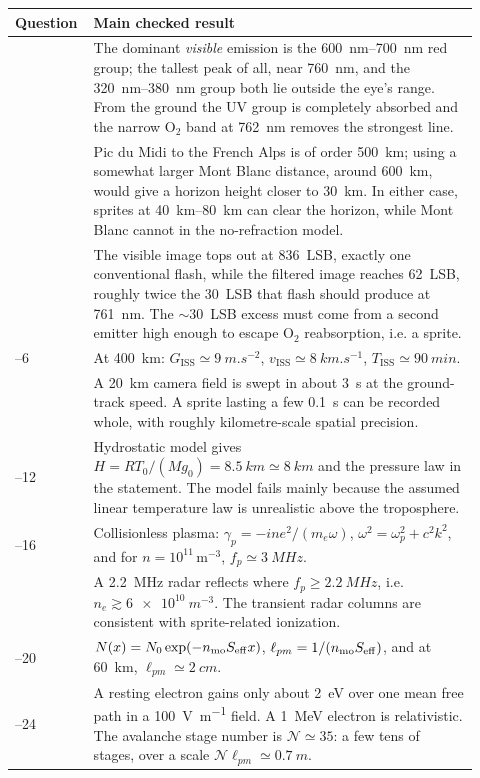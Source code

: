 \documentclass[11pt,a4paper]{article}
\newcommand{\ISS}{\mathrm{ISS}}
\newcommand{\Otwo}{\ensuremath{\mathrm{O}_2}}
\begin{document}
\begin{longtable}{>{\raggedright\arraybackslash}p{0.12\linewidth}>{\raggedright\arraybackslash}p{0.80\linewidth}}
\toprule
\textbf{Question} & \textbf{Main checked result}\\
\midrule
1 & The dominant \emph{visible} emission is the \SIrange{600}{700}{nm} red group; the tallest peak of all, near \SI{760}{nm}, and the \SIrange{320}{380}{nm} group both lie outside the eye's range. From the ground the UV group is completely absorbed and the narrow \Otwo{} band at \SI{762}{nm} removes the strongest line.\\
2 & Pic du Midi to the French Alps is of order \SI{500}{km}; using a somewhat larger Mont Blanc distance, around \SI{600}{km}, would give a horizon height closer to \SI{30}{km}. In either case, sprites at \SIrange{40}{80}{km} can clear the horizon, while Mont Blanc cannot in the no-refraction model.\\
3 & The visible image tops out at 836~LSB, exactly one conventional flash, while the filtered image reaches 62~LSB, roughly twice the 30~LSB that flash should produce at \SI{761}{nm}. The $\sim$30~LSB excess must come from a second emitter high enough to escape \Otwo{} reabsorption, i.e. a sprite.\\
4--6 & At \SI{400}{km}: $G_{\ISS}\simeq \SI{9}{m.s^{-2}}$, $v_{\ISS}\simeq \SI{8}{km.s^{-1}}$, $T_{\ISS}\simeq \SI{90}{min}$.\\
7 & A \SI{20}{km} camera field is swept in about \SI{3}{s} at the ground-track speed. A sprite lasting a few \SI{0.1}{s} can be recorded whole, with roughly kilometre-scale spatial precision.\\
8--12 & Hydrostatic model gives $H=RT_0/(Mg_0)=\SI{8.5}{km}\simeq\SI{8}{km}$ and the pressure law in the statement. The model fails mainly because the assumed linear temperature law is unrealistic above the troposphere.\\
13--16 & Collisionless plasma: $\gamma_p=-i n e^2/(m_e\omega)$, $\omega^2=\omega_p^2+c^2k^2$, and for $n=10^{11}\,\mathrm{m^{-3}}$, $f_p\simeq\SI{3}{MHz}$.\\
17 & A \SI{2.2}{MHz} radar reflects where $f_p\geq\SI{2.2}{MHz}$, i.e. $n_e\gtrsim \SI{6e10}{m^{-3}}$. The transient radar columns are consistent with sprite-related ionization.\\
18--20 & $N(x)=N_0\exp(-n_{\rm mo}S_{\rm eff}x)$, $\ell_{pm}=1/(n_{\rm mo}S_{\rm eff})$, and at \SI{60}{km}, $\ell_{pm}\simeq\SI{2}{cm}$.\\
21--24 & A resting electron gains only about \SI{2}{eV} over one mean free path in a \SI{100}{V.m^{-1}} field. A \SI{1}{MeV} electron is relativistic. The avalanche stage number is $\mathcal{N}\simeq35$: a few tens of stages, over a scale $\mathcal{N}\ell_{pm}\simeq\SI{0.7}{m}$.\\
\bottomrule
\end{longtable}
\end{document}
